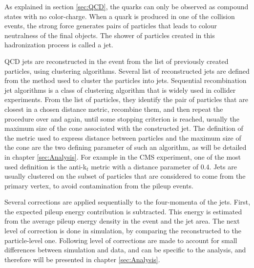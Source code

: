 As explained in section \ref{sec:QCD}, the quarks can only be observed as compound states with no color-charge. When a quark is produced in one of the collision events, the strong force generates pairs of particles that leads to colour neutralness of the final objects. The shower of particles created in this hadronization process is called a jet.

QCD jets are reconstructed in the event from the list of previously created particles, using clustering algorithms. Several list of reconstructed jets are defined from the method used to cluster the particles into jets. Sequential recombination jet algorithms is a class of clustering algorithm that is widely used in collider experiments. From the list of particles, they identify the pair of particles that are closest in a chosen distance metric, recombine them, and then repeat the procedure over and again, until some stopping criterion is reached, usually the maximum size of the cone associated with the constructed jet. The definition of the metric used to express distance between particles and the maximum size of the cone are the two defining parameter of such an algorithm, as will be detailed in chapter \ref{sec:Analysis}. For example in the CMS experiment, one of the most used definition is the anti-k$_t$ metric with a distance parameter of 0.4. Jets are usually clustered on the subset of particles that are considered to come from the primary vertex, to avoid contamination from the pileup events.

Several corrections are applied sequentially to the four-momenta of the jets. First, the expected pileup energy contribution is subtracted. This energy is estimated from the average pileup energy density in the event and the jet area. The next level of correction is done in simulation, by comparing the reconstructed \pt to the particle-level one. Following level of corrections are made to account for small differences between simulation and data, and can be specific to the analysis, and therefore will be presented in chapter \ref{sec:Analysis}.

